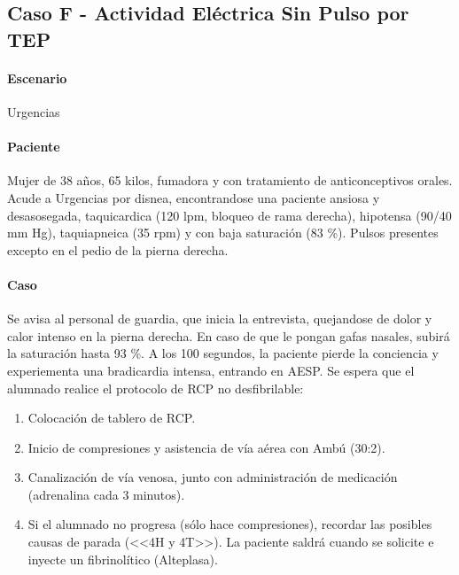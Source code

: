 \subsection{Caso F - Actividad Eléctrica Sin Pulso por TEP}
\paragraph{Escenario} Urgencias
\vspace{-12.5pt}
\paragraph{Paciente} Mujer de 38 años, 65 kilos, fumadora y con tratamiento de anticonceptivos orales. Acude a Urgencias por disnea, encontrandose una paciente ansiosa y desasosegada, taquicardica (120 lpm, bloqueo de rama derecha), hipotensa (90/40 mm Hg), taquiapneica (35 rpm) y con baja saturación (83 \%). Pulsos presentes excepto en el pedio de la pierna derecha.
\vspace{-12.5pt}
\paragraph{Caso} Se avisa al personal de guardia, que inicia la entrevista, quejandose de dolor y calor intenso en la pierna derecha. En caso de que le pongan gafas nasales, subirá la saturación hasta 93 \%. A los 100 segundos, la paciente pierde la conciencia y experiementa una bradicardia intensa, entrando en AESP. Se espera que el alumnado realice el protocolo de RCP no desfibrilable:
\begin{enumerate}[topsep=0pt, partopsep=0pt,itemsep=0pt,parsep=0pt]
    \item Colocación de tablero de RCP.
    \item Inicio de compresiones y asistencia de vía aérea con Ambú (30:2).
    \item Canalización de vía venosa, junto con administración de medicación (adrenalina cada 3 minutos).
    \item Si el alumnado no progresa (sólo hace compresiones), recordar las posibles causas de parada (<<4H y 4T>>). La paciente saldrá cuando se solicite e inyecte un fibrinolítico (Alteplasa).
\end{enumerate}
\vspace{-12.5pt}
